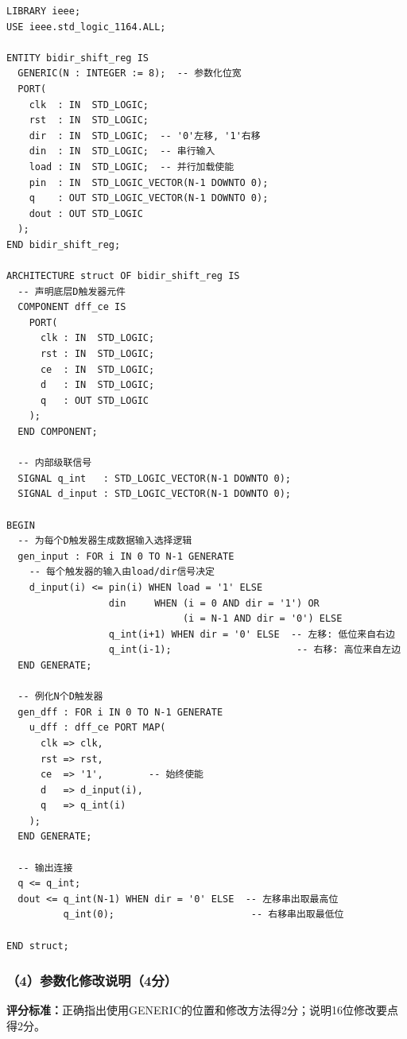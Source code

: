 \begin{lstlisting}[language=VDL, caption={N位双向移位寄存器——结构化VHDL代码}]
LIBRARY ieee;
USE ieee.std_logic_1164.ALL;

ENTITY bidir_shift_reg IS
  GENERIC(N : INTEGER := 8);  -- 参数化位宽
  PORT(
    clk  : IN  STD_LOGIC;
    rst  : IN  STD_LOGIC;
    dir  : IN  STD_LOGIC;  -- '0'左移, '1'右移
    din  : IN  STD_LOGIC;  -- 串行输入
    load : IN  STD_LOGIC;  -- 并行加载使能
    pin  : IN  STD_LOGIC_VECTOR(N-1 DOWNTO 0);
    q    : OUT STD_LOGIC_VECTOR(N-1 DOWNTO 0);
    dout : OUT STD_LOGIC
  );
END bidir_shift_reg;

ARCHITECTURE struct OF bidir_shift_reg IS
  -- 声明底层D触发器元件
  COMPONENT dff_ce IS
    PORT(
      clk : IN  STD_LOGIC;
      rst : IN  STD_LOGIC;
      ce  : IN  STD_LOGIC;
      d   : IN  STD_LOGIC;
      q   : OUT STD_LOGIC
    );
  END COMPONENT;

  -- 内部级联信号
  SIGNAL q_int   : STD_LOGIC_VECTOR(N-1 DOWNTO 0);
  SIGNAL d_input : STD_LOGIC_VECTOR(N-1 DOWNTO 0);

BEGIN
  -- 为每个D触发器生成数据输入选择逻辑
  gen_input : FOR i IN 0 TO N-1 GENERATE
    -- 每个触发器的输入由load/dir信号决定
    d_input(i) <= pin(i) WHEN load = '1' ELSE
                  din     WHEN (i = 0 AND dir = '1') OR
                               (i = N-1 AND dir = '0') ELSE
                  q_int(i+1) WHEN dir = '0' ELSE  -- 左移: 低位来自右边
                  q_int(i-1);                      -- 右移: 高位来自左边
  END GENERATE;

  -- 例化N个D触发器
  gen_dff : FOR i IN 0 TO N-1 GENERATE
    u_dff : dff_ce PORT MAP(
      clk => clk,
      rst => rst,
      ce  => '1',        -- 始终使能
      d   => d_input(i),
      q   => q_int(i)
    );
  END GENERATE;

  -- 输出连接
  q <= q_int;
  dout <= q_int(N-1) WHEN dir = '0' ELSE  -- 左移串出取最高位
          q_int(0);                        -- 右移串出取最低位

END struct;
\end{lstlisting}

\subsubsection{（4）参数化修改说明（4分）}

\begin{framed}
\textbf{评分标准：}正确指出使用GENERIC的位置和修改方法得2分；说明16位修改要点得2分。
\end{framed}


